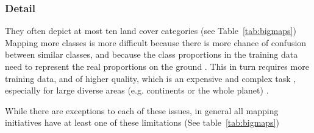     \subsubsection{Detail}
        They often depict at most ten land cover categories (see Table~\ref{tab:bigmaps}) Mapping more classes is more difficult because there is more chance of confusion between similar classes, and because the class proportions in the training data need to represent the real proportions on the ground \citep{kleinewillinghofer2022unbiased}. This in turn requires more training data, and of higher quality, which is an expensive and complex task \citep{li2021improving}, especially for large diverse areas (e.g. continents or the whole planet) \citep{tsendbazar2021towards,stanimirova2023global}.

    While there are exceptions to each of these issues, in general all mapping initiatives have at least one of these limitations (See table~\ref{tab:bigmaps})

    \begin{table}[h]
    \centering
    \caption{Summary of Mapping Products and Data Availability}
    \label{tab:bigmaps}
    \end{table}

